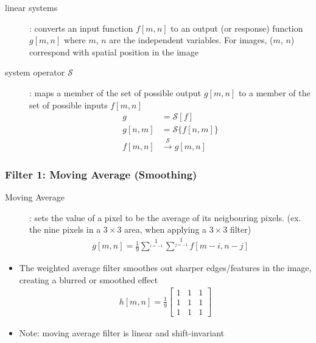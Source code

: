 \documentclass[letterpaper,12pt]{article}
\begin{document}
\begin{description}
 \item[linear systems]: converts an input function $f[m,n]$ to an output (or response) function $g[m,n]$ where $m$, $n$ are the independent variables. For images, ($m$, $n$) correspond with spatial position in the image
 \item[system operator $\mathcal{S}$]: maps a member of the set of possible output $g[m,n]$ to a member of the set of possible inputs $f[m,n]$
       \begin{align}
        g      & = \mathcal{S}[f]                 \\
        g[n,m] & = \mathcal{S}\{f[n,m]\}          \\
        f[m,n] & \xrightarrow{\mathcal{S}} g[m,n]
       \end{align}
\end{description}

\subsubsection{Filter 1: Moving Average (Smoothing)}
\begin{description}
 \item[Moving Average]: sets the value of a pixel to be the average of its neigbouring pixels. (ex. the nine pixels in a $3 \times 3$ area, when applying a $3 \times 3$ filter)
       \begin{align}
        g[m,n] = \frac{1}{9} \sum\limits^1\limits_{i=-1} \sum\limits^1\limits_{j=-1} f[m-i, n-j] \tag{Weighted Average}
       \end{align}
\end{description}
\begin{itemize}
 \item The weighted average filter smoothes out sharper edges/features in the image, creating a blurred or smoothed effect
       \begin{align}
        h[m,n] = \frac{1}{9}
        \begin{bmatrix}
         1 & 1 & 1 \\
         1 & 1 & 1 \\
         1 & 1 & 1
        \end{bmatrix}
       \end{align}
 \item Note: moving average filter is linear and shift-invariant
\end{itemize}
\end{document}

